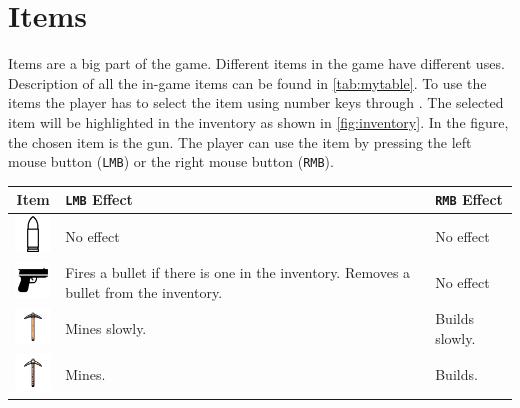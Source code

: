 \section{Items}
Items are a big part of the game.
Different items in the game have different uses.
Description of all the in-game items can be found in \autoref{tab:mytable}.
To use the items the player has to select the item using number keys  through .
The selected item will be highlighted in the inventory as shown in \autoref{fig:inventory}.
In the figure, the chosen item is the gun.
The player can use the item by pressing the left mouse button (\texttt{LMB}) or the right mouse button (\texttt{RMB}).

\begin{table}[h]
    \centering
    \begin{tabular}{|c|p{5cm}|p{5cm}|}
        \hline
        Item                                                                         & \texttt{LMB} Effect                                                                   & \texttt{RMB} Effect \\
        \hline
        \includegraphics[width=1cm]{chapters/user_manual/resources/bullet.png}       & No effect                                                                             & No effect           \\
        \hline
        \includegraphics[width=1cm]{chapters/user_manual/resources/pistol.png}       & Fires a bullet if there is one in the inventory. Removes a bullet from the inventory. & No effect           \\
        \hline
        \includegraphics[width=1cm]{chapters/user_manual/resources/pickaxe-slow.png} & Mines slowly.                                                                         & Builds slowly.      \\
        \hline
        \includegraphics[width=1cm]{chapters/user_manual/resources/pickaxe-mid.png}  & Mines.                                                                                & Builds.             \\

\end{tabular}
\end{table}
